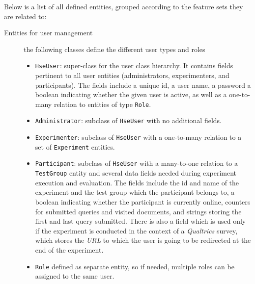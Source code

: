 \documentclass[a4paper]{usiinfbachelorproject}
\begin{document}
Below is a list of all defined entities, grouped according to the feature sets they are related to:

    \begin{description}

        \item[Entities for user management] the following classes define the different user types and roles 

            \begin{itemize}

                \item \texttt{HseUser}: super-class for the user class hierarchy. It contains fields pertinent to all
                    user entities (administrators, experimenters, and participants). The fields include a unique id, a user name, a password
                    a boolean indicating whether the given user is active, as well as a one-to-many relation to entities
                    of type \texttt{Role}.

                \item \texttt{Administrator}: subclass of \texttt{HseUser} with no additional fields.

                \item \texttt{Experimenter}: subclass of \texttt{HseUser} with a one-to-many relation to a set of \texttt{Experiment} entities.

                \item \texttt{Participant}: subclass of \texttt{HseUser} with a many-to-one relation to a \texttt{TestGroup} entity and
                    several data fields needed during experiment execution and evaluation. The fields include the id and name of the experiment
                    and the test group which the participant belongs to, a boolean indicating whether the participant is currently online,
                    counters for submitted queries and visited documents, and strings storing the first and last query submitted. There
                    is also a field which is used only if the experiment is conducted in the context of a \emph{Qualtrics} survey,
                    which stores the \emph{URL} to which the user is going to be redirected at the end of the experiment.

                \item \texttt{Role} defined as separate entity, so if needed, multiple roles can be assigned to the same user.

            \end{itemize}


\end{description}
\end{document}
